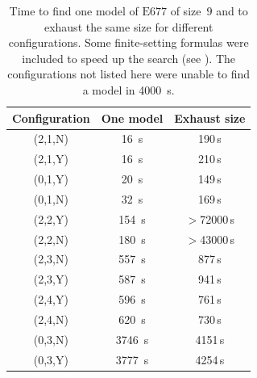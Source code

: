 \documentclass[12pt]{amsart}
\theoremstyle{definition}
\newcommand{\Eq}[1]{\mathrm{E}#1}
\begin{document}
\begin{table}
\caption{Time to find one model of $\Eq{677}$ of size~$9$ and to exhaust the same size for different configurations. Some finite-setting formulas were included to speed up the search (see ). The configurations not listed here were unable to find a model in \SI{4000}{s}.}
\label{table:677models}
\centering
\small
{}
\begin{tabular}{cSS}\toprule
Configuration & {One model} & {Exhaust size} \\\midrule
(2,1,N) & 16 \,\unit{s} & 190\,\unit{s} \\
(2,1,Y) & 16 \,\unit{s} & 210\,\unit{s}\\
(0,1,Y) & 20 \,\unit{s} & 149\,\unit{s}\\
(0,1,N) & 32 \,\unit{s} & 169\,\unit{s}\\
(2,2,Y) & 154 \,\unit{s} & {$>$}72000\,\unit{s} \\
(2,2,N) & 180 \,\unit{s} & {$>$}43000\,\unit{s} \\
(2,3,N) & 557 \,\unit{s} & 877\,\unit{s}\\
(2,3,Y) & 587 \,\unit{s} & 941\,\unit{s}\\
(2,4,Y) & 596 \,\unit{s} & 761\,\unit{s}\\
(2,4,N) & 620 \,\unit{s} & 730\,\unit{s}\\
(0,3,N) & 3746 \,\unit{s} & 4151\,\unit{s}\\
(0,3,Y) & 3777 \,\unit{s} & 4254\,\unit{s}\\
\bottomrule
\end{tabular}
\end{table}
\end{document}
